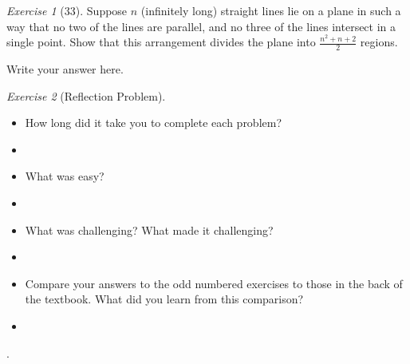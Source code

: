 \documentclass[12pt]{amsart}
\makeatletter
\theoremstyle{remark}
\newtheorem*{exercise}{Exercise}%
\renewenvironment{proof}[1][\proofname]{\par\doublespacing
  \pushQED{\qed}%
  \normalfont \topsep6\p@\@plus6\p@\relax
  \list{}{%
    \settowidth{\leftmargin}{\itshape\proofname:\hskip\labelsep}%
    \setlength{\labelwidth}{0pt}%
    \setlength{\itemindent}{-\leftmargin}%
  }%
  \item[\hskip\labelsep\itshape#1\@addpunct{:}]\ignorespaces
}{%
  \popQED\endlist\@endpefalse
  \singlespacing
}
\theoremstyle{mycomment}
\makeatother
\begin{document}
\begin{exercise}[33] Suppose $n$ (infinitely long) straight lines lie on a plane in such a way that no two of the lines are parallel, and no three of the lines intersect in a single point. Show that this arrangement divides the plane into $\frac{n^{2}+n+2}{2}$ regions.
\begin{proof}
Write your answer here.
\end{proof}
\end{exercise}



\begin{exercise}[Reflection Problem] \ 
\begin{itemize}
\item How long did it take you to complete each problem? 
\begin{proof}[Answer]
\end{proof}
\item What was easy?
\begin{proof}[Answer]
\end{proof}
\item What was challenging? What made it challenging?
\begin{proof}[Answer]
\end{proof}
\item Compare your answers to the odd numbered exercises to those in the back of the textbook. What did you learn from this comparison?
\begin{proof}[Answer]
\end{proof}
\end{itemize}
\end{exercise}.















 
\end{document}
